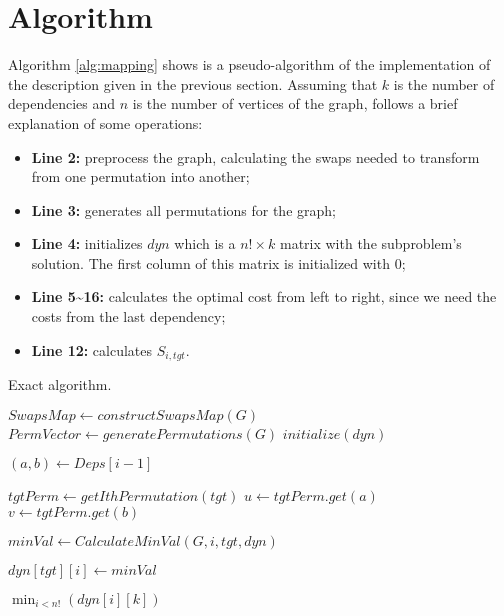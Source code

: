 \documentclass[paper=a4, fontsize=12pt]{scrartcl}
\begin{document}
	\section{Algorithm}
	
	Algorithm \ref{alg:mapping} shows is a pseudo-algorithm of the implementation of the description given in the previous section. Assuming that $k$ is the number of dependencies and $n$ is the number of vertices of the graph, follows a brief explanation of some operations:
	
	\begin{itemize}
		\item \textbf{Line 2:} preprocess the graph, calculating the swaps needed to transform from one permutation into another;
		
		\item \textbf{Line 3:} generates all permutations for the graph;
		
		\item \textbf{Line 4:} initializes $dyn$ which is a $n! \times k$ matrix with the subproblem's solution. The first column of this matrix is initialized with $0$;
		
		\item \textbf{Line 5\textasciitilde16:} calculates the optimal cost from left to right, since we need the costs from the last dependency;
		
		\item \textbf{Line 12:} calculates $S_{i,tgt}$.
	\end{itemize}

	\begin{algorithm}
		\caption{Exact algorithm.}
		
		\begin{algorithmic}[1]
			\Statex
			
			\State $SwapsMap \gets constructSwapsMap(G)$
			\State $PermVector \gets generatePermutations(G)$
			\State $initialize(dyn)$
			
			\State $(a, b) \gets Deps[i-1]$
			
			\State $tgtPerm \gets getIthPermutation(tgt)$
			\State $u \gets tgtPerm.get(a)$
			\State $v \gets tgtPerm.get(b)$
			
			\State $minVal \gets CalculateMinVal(G, i, tgt, dyn)$
			\EndIf
			
			\State $dyn[tgt][i] \gets minVal$
			\EndFor
			\EndFor
			
			\State \Return $\min_{i < n!}(dyn[i][k])$
			\EndFunction
		\end{algorithmic}
		\label{alg:mapping}
	\end{algorithm}
\end{document}
